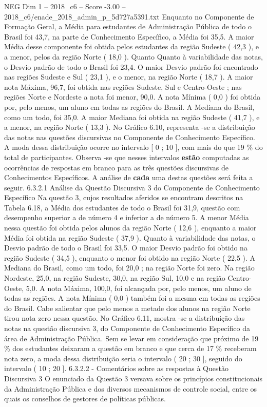 \begin{textsample}{NEG Dim 1 – 2018\_c6 – Score -3.00 – 2018\_c6/enade\_2018\_admin\_p\_5d727a5391.txt}
Enquanto no Componente de Formação Geral, a Média para estudantes de Administração Pública de todo o Brasil foi 43,7, na parte de Conhecimento Específico, a Média foi 35,5.
A maior Média desse componente foi obtida pelos estudantes da região Sudeste ( 42,3 ), e a menor, pelos da região Norte ( 18,0 ).
Quanto Quanto à variabilidade das notas, o Desvio padrão de todo o Brasil foi 23,4.
O maior Desvio padrão foi encontrado nas regiões Sudeste e Sul ( 23,1 ), e o menor, na região Norte ( 18,7 ).
A maior nota Máxima, 96,7, foi obtida nas regiões Sudeste, Sul e Centro-Oeste ; nas regiões Norte e Nordeste a nota foi menor, 90,0.
A nota Mínima ( 0,0 ) foi obtida por, pelo menos, um aluno em todas as regiões do Brasil.
A Mediana do Brasil, como um todo, foi 35,0.
A maior Mediana foi obtida na região Sudeste ( 41,7 ), e a menor, na região Norte ( 13,3 ).
No Gráfico 6.10, representa -se a distribuição das notas nas questões discursivas no Componente de Conhecimento Específico.
A moda dessa distribuição ocorre no intervalo [ 0 ; 10 ], com mais do que 19 \% do total de participantes.
Observa -se que nesses intervalos \textbf{estão} computadas as ocorrências de respostas em branco para as três questões discursivas de Conhecimentos Específicos.
A análise de \textbf{cada} uma destas questões será feita a seguir. 6.3.2.1 Análise da Questão Discursiva 3 do Componente de Conhecimento Específico Na questão 3, cujos resultados aferidos se encontram descritos na Tabela 6.18, a Média dos estudantes de todo o Brasil foi 31,9, questão com desempenho superior a de número 4 e inferior a de número 5.
A menor Média nessa questão foi obtida pelos alunos da região Norte ( 12,6 ), enquanto a maior Média foi obtida na região Sudeste ( 37,9 ).
Quanto à variabilidade das notas, o Desvio padrão de todo o Brasil foi 33,5.
O maior Desvio padrão foi obtido na região Sudeste ( 34,5 ), enquanto o menor foi obtido na região Norte ( 22,5 ).
A Mediana do Brasil, como um todo, foi 20,0 ; na região Norte foi zero.
Na região Nordeste, 25,0, na região Sudeste, 30,0, na região Sul, 10,0 e na região Centro-Oeste, 5,0.
A nota Máxima, 100,0, foi alcançada por, pelo menos, um aluno de todas as regiões.
A nota Mínima ( 0,0 ) também foi a mesma em todas as regiões do Brasil.
Cabe salientar que pelo menos a metade dos alunos na região Norte tirou nota zero nessa questão.
No Gráfico 6.11, mostra -se a distribuição das notas na questão discursiva 3, do Componente de Conhecimento Específico da área de Administração Pública.
Sem se levar em consideração que próximo de 19 \% dos estudantes deixaram a questão em branco e que cerca de 17 \% receberam nota zero, a moda dessa distribuição seria o intervalo ( 20 ; 30 ], seguido do intervalo ( 10 ; 20 ]. 6.3.2.2 - Comentários sobre as respostas à Questão Discursiva 3 O enunciado da Questão 3 versava sobre os princípios constitucionais da Administração Pública e dos diversos mecanismos de controle social, entre os quais os conselhos de gestores de políticas públicas.

\end{textsample}
